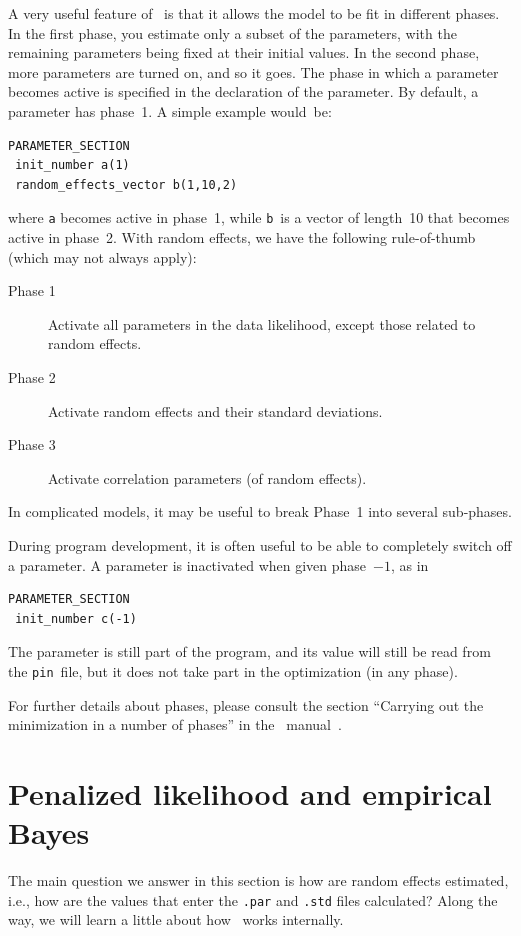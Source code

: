 \documentclass{admbmanual}
\begin{document}
A very useful feature of \scAB\ is that it allows the model to be fit in
different phases. In the first phase, you estimate only a subset of the
parameters, with the remaining parameters being fixed at their initial values.
In the second phase, more parameters are turned on, and so it goes. The phase in
which a parameter becomes active is specified in the declaration of the
parameter. By default, a parameter has phase~1. A simple example would~be:
\begin{lstlisting}
PARAMETER_SECTION
 init_number a(1)
 random_effects_vector b(1,10,2)
\end{lstlisting}
where \texttt{a} becomes active in phase~1, while \texttt{b}\ is a vector of
length~10 that becomes active in phase~2. With random effects, we have the
following rule-of-thumb (which may not always apply):
\begin{description}
\item[Phase 1] Activate all parameters in the data likelihood, except those
related to random effects.
\item[Phase 2] Activate random effects and their standard deviations.
\item[Phase 3] Activate correlation parameters (of random effects).
\end{description}
In complicated models, it may be useful to break Phase~1 into several
sub-phases.

During program development, it is often useful to be able to completely switch
off a parameter. A parameter is inactivated when given phase~$-1$, as in
\begin{lstlisting}
PARAMETER_SECTION
 init_number c(-1)
\end{lstlisting}
The parameter is still part of the program, and its value will still be read
from the \texttt{pin}~file, but it does not take part in the optimization (in
any phase).

For further details about phases, please consult the section ``Carrying out the
minimization in a number of phases'' in the \scAB\ manual~\cite{admb_manual}.

\section{Penalized likelihood and empirical Bayes}
\label{sec:hood}

The main question we answer in this section is how are random effects estimated,
i.e., how are the values that enter the \texttt{.par} and \texttt{.std} files
calculated? Along the way, we will learn a little about how \scAR\ works
internally.
\end{document}
